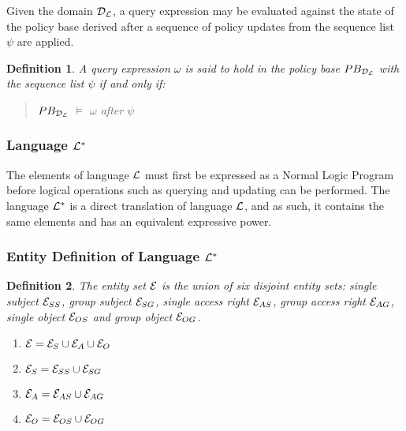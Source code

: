 \documentclass[10pt, twocolumn]{article}
\newtheorem{definition}{Definition}
\begin{document}
        Given the domain ${\cal D}_{\cal L}$, a query expression may be
        evaluated against the state of the policy base derived after a sequence
        of policy updates from the sequence list $\psi$ are applied.

        \begin{definition}
          A query expression $\omega$ is said to hold in the policy base
          $PB_{{\cal D}_{\cal L}}$ with the sequence list $\psi$ if and only
          if:

          \begin{quote}
            $PB_{{\cal D}_{\cal L}}$ $\models$ $\omega$ after $\psi$
          \end{quote}
          
        \end{definition}

      \subsubsection{Language ${\cal L}^{*}$}

        The elements of language ${\cal L}$ must first be expressed as a Normal
        Logic Program before logical operations such as querying and updating
        can be performed. The language ${\cal L}^{*}$ is a direct translation
        of language ${\cal L}$, and as such, it contains the same elements and
        has an equivalent expressive power.

      \subsubsection{Entity Definition of Language ${\cal L}^{*}$}

        \begin{definition}

          The entity set ${\cal E}$ is the union of six disjoint entity sets:
          single subject ${\cal E}_{SS}$, group subject ${\cal E}_{SG}$,
          single access right ${\cal E}_{AS}$, group access right
          ${\cal E}_{AG}$, single object ${\cal E}_{OS}$ and group object
          ${\cal E}_{OG}$.

          \begin{enumerate}
            \item
              ${\cal E} = {\cal E}_{S} \cup {\cal E}_{A} \cup {\cal E}_{O}$
            \item
              ${\cal E}_{S} = {\cal E}_{SS} \cup {\cal E}_{SG}$
            \item
              ${\cal E}_{A} = {\cal E}_{AS} \cup {\cal E}_{AG}$
            \item
              ${\cal E}_{O} = {\cal E}_{OS} \cup {\cal E}_{OG}$
          \end{enumerate}

        \end{definition}
\end{document}
